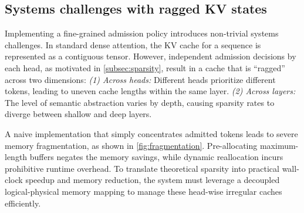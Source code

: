 \subsection{Systems challenges with ragged KV states}
\label{subsec:ragged}

Implementing a fine-grained admission policy introduces non-trivial systems challenges. In standard dense attention, the KV cache for a sequence is represented as a contiguous tensor. However, independent admission decisions by each head, as motivated in \cref{subsec:sparsity}, result in a cache that is ``ragged'' across two dimensions: \textit{(1) Across heads:} Different heads prioritize different tokens, leading to uneven cache lengths within the same layer. \textit{(2) Across layers:} The level of semantic abstraction varies by depth, causing sparsity rates to diverge between shallow and deep layers.

A naive implementation that simply concentrates admitted tokens leads to severe memory fragmentation, as shown in \cref{fig:fragmentation}. Pre-allocating maximum-length buffers negates the memory savings, while dynamic reallocation incurs prohibitive runtime overhead. To translate theoretical sparsity into practical wall-clock speedup and memory reduction, the system must leverage a decoupled logical-physical memory mapping to manage these head-wise irregular caches efficiently.


